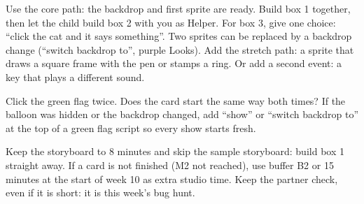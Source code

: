 \begin{differentiation}
\supportpath Use the core path: the backdrop and first sprite are ready. Build box 1 together, then let the child build box 2 with you as Helper. For box 3, give one choice: \enquote{click the cat and it says something}. Two sprites can be replaced by a backdrop change (\enquote{switch backdrop to}, purple Looks).
\extensionpath Add the stretch path: a sprite that draws a square frame with the pen or stamps a ring. Or add a second event: a key that plays a different sound.
\end{differentiation}

\begin{stretchchallenge}
Click the green flag twice. Does the card start the same way both times? If the balloon was hidden or the backdrop changed, add \enquote{show} or \enquote{switch backdrop to} at the top of a green flag script so every show starts fresh.
\end{stretchchallenge}

\begin{teachernote}
Keep the storyboard to 8 minutes and skip the sample storyboard: build box 1 straight away. If a card is not finished (M2 not reached), use buffer B2 or 15 minutes at the start of week 10 as extra studio time. Keep the partner check, even if it is short: it is this week's bug hunt.
\end{teachernote}
